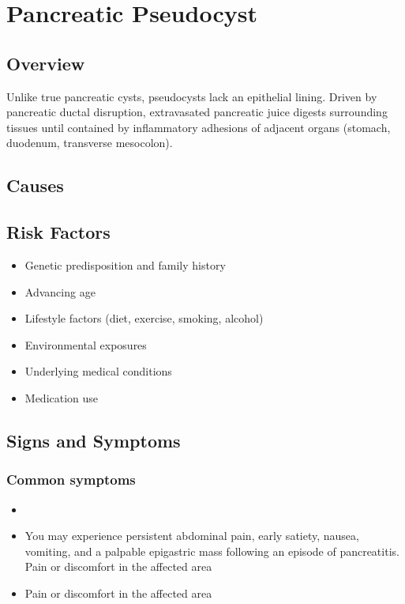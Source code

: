 \chapter{Pancreatic Pseudocyst}
\label{sec:Pancreatic Pseudocyst}

\section{Overview}
Unlike true pancreatic cysts, pseudocysts lack an epithelial lining. Driven by pancreatic ductal disruption, extravasated pancreatic juice digests surrounding tissues until contained by inflammatory adhesions of adjacent organs (stomach, duodenum, transverse mesocolon).
\section{Causes}
\section{Risk Factors}

\begin{itemize}[noitemsep]
  \item Genetic predisposition and family history
  \item Advancing age
  \item Lifestyle factors (diet, exercise, smoking, alcohol)
  \item Environmental exposures
  \item Underlying medical conditions
  \item Medication use
\end{itemize}
\section{Signs and Symptoms}

\subsection{Common symptoms}
\begin{itemize}[noitemsep]
  \item \item You may experience persistent abdominal pain, early satiety, nausea, vomiting, and a palpable epigastric mass following an episode of pancreatitis. Pain or discomfort in the affected area    \item Pain or discomfort in the affected area
  \end{itemize}


